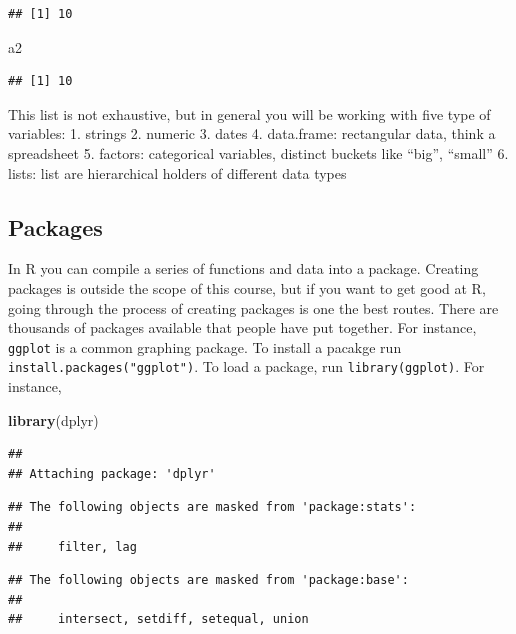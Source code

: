 \documentclass[]{book}
\newenvironment{Shaded}{\begin{snugshade}}{\end{snugshade}}
\newcommand{\KeywordTok}[1]{\textcolor[rgb]{0.13,0.29,0.53}{\textbf{#1}}}
\newcommand{\NormalTok}[1]{#1}
\begin{document}
\begin{verbatim}
## [1] 10
\end{verbatim}

\begin{Shaded}
\begin{Highlighting}[]
\NormalTok{a2}
\end{Highlighting}
\end{Shaded}

\begin{verbatim}
## [1] 10
\end{verbatim}

This list is not exhaustive, but in general you will be working with five type of variables:
1. strings
2. numeric
3. dates
4. data.frame: rectangular data, think a spreadsheet
5. factors: categorical variables, distinct buckets like ``big'', ``small''
6. lists: list are hierarchical holders of different data types

\hypertarget{packages}{%
\subsection{Packages}\label{packages}}

In R you can compile a series of functions and data into a package. Creating packages is outside the scope of this course, but if you want to get good at R, going through the process of creating packages is one the best routes. There are thousands of packages available that people have put together. For instance, \texttt{ggplot} is a common graphing package. To install a pacakge run \texttt{install.packages("ggplot")}. To load a package, run \texttt{library(ggplot)}. For instance,

\begin{Shaded}
\begin{Highlighting}[]
\KeywordTok{library}\NormalTok{(dplyr)}
\end{Highlighting}
\end{Shaded}

\begin{verbatim}
## 
## Attaching package: 'dplyr'
\end{verbatim}

\begin{verbatim}
## The following objects are masked from 'package:stats':
## 
##     filter, lag
\end{verbatim}

\begin{verbatim}
## The following objects are masked from 'package:base':
## 
##     intersect, setdiff, setequal, union
\end{verbatim}
\end{document}
